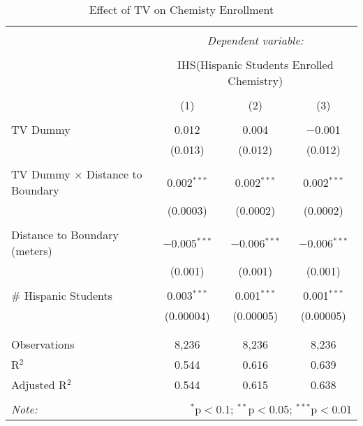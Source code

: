 
\begin{table}[!htbp] \centering 
  \caption{Effect of TV on Chemisty Enrollment} 
  \label{} 
\begin{tabular}{@{\extracolsep{-2pt}}lccc} 
\\[-1.8ex]\hline 
\hline \\[-1.8ex] 
 & \multicolumn{3}{c}{\textit{Dependent variable:}} \\ 
\cline{2-4} 
\\[-1.8ex] & \multicolumn{3}{c}{IHS(Hispanic Students Enrolled Chemistry)} \\ 
\\[-1.8ex] & (1) & (2) & (3)\\ 
\hline \\[-1.8ex] 
 TV Dummy & 0.012 & 0.004 & $-$0.001 \\ 
  & (0.013) & (0.012) & (0.012) \\ 
  & & & \\ 
 TV Dummy $\times$ Distance to Boundary & 0.002$^{***}$ & 0.002$^{***}$ & 0.002$^{***}$ \\ 
  & (0.0003) & (0.0002) & (0.0002) \\ 
  & & & \\ 
 Distance to Boundary (meters) & $-$0.005$^{***}$ & $-$0.006$^{***}$ & $-$0.006$^{***}$ \\ 
  & (0.001) & (0.001) & (0.001) \\ 
  & & & \\ 
 \# Hispanic Students & 0.003$^{***}$ & 0.001$^{***}$ & 0.001$^{***}$ \\ 
  & (0.00004) & (0.00005) & (0.00005) \\ 
  & & & \\ 
\hline \\[-1.8ex] 
Observations & 8,236 & 8,236 & 8,236 \\ 
R$^{2}$ & 0.544 & 0.616 & 0.639 \\ 
Adjusted R$^{2}$ & 0.544 & 0.615 & 0.638 \\ 
\hline 
\hline \\[-1.8ex] 
\textit{Note:}  & \multicolumn{3}{r}{$^{*}$p$<$0.1; $^{**}$p$<$0.05; $^{***}$p$<$0.01} \\ 
\end{tabular} 
\end{table} 
